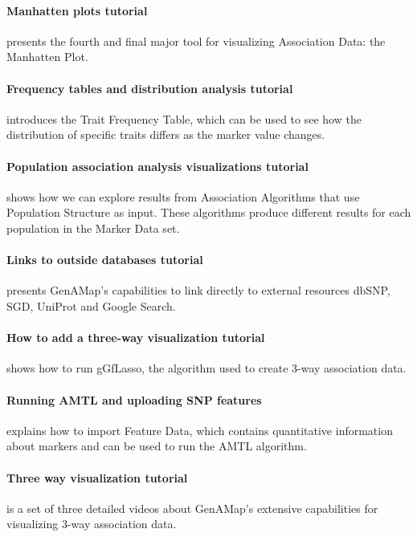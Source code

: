 \documentclass{article}
\begin{document}
\begin{appendices}
\paragraph{Manhatten plots tutorial} presents the fourth and final major tool for visualizing Association Data: the Manhatten Plot.
\paragraph{Frequency tables and distribution analysis tutorial} introduces the Trait Frequency Table, which can be used to see how the distribution of specific traits differs as the marker value changes.
\paragraph{Population association analysis visualizations tutorial} shows how we can explore results from Association Algorithms that use Population Structure as input. These algorithms produce different results for each population in the Marker Data set.
\paragraph{Links to outside databases tutorial} presents GenAMap's capabilities to link directly to external resources dbSNP, SGD, UniProt and Google Search.
\paragraph{How to add a three-way visualization tutorial} shows how to run gGfLasso, the algorithm used to create 3-way association data. 
\paragraph{Running AMTL and uploading SNP features} explains how to import Feature Data, which contains quantitative information about markers and can be used to run the AMTL algorithm.
\paragraph{Three way visualization tutorial} is a set of three detailed videos about GenAMap's extensive capabilities for visualizing 3-way association data.


\end{appendices}
\end{document}
